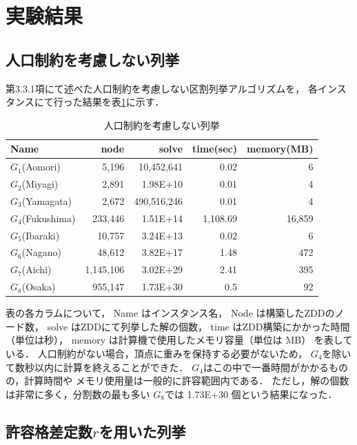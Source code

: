 \section{実験結果}

\subsection{人口制約を考慮しない列挙}

第3.3.1項にて述べた人口制約を考慮しない区割列挙アルゴリズムを，
各インスタンスにて行った結果を表\ref{out_normal}に示す．

\begin{table}[htbp]
  \caption{人口制約を考慮しない列挙}
  \label{out_normal}
  \centering
  \begin{tabular}{l||r|r|r|r}
    \hline
    Name & node & solve & time(sec) & memory(MB) \\
    \hline \hline
    $G_1$(Aomori) & 5{,}196 & 10{,}452{,}641 & 0.02 & 6 \\
    $G_2$(Miyagi) & 2{,}891 & 1.98E+10 & 0.01 & 4 \\
    $G_3$(Yamagata) & 2{,}672 & 490{,}516{,}246 & 0.01 & 4 \\
    $G_4$(Fukushima) & 233{,}446 & 1.51E+14 & 1{,}108.69 & 16{,}859 \\
    $G_5$(Ibaraki) & 10{,}757 & 3.24E+13 & 0.02 & 6 \\
    $G_6$(Nagano) & 48{,}612 & 3.82E+17 & 1.48 & 472 \\
    $G_7$(Aichi) & 1{,}145{,}106 & 3.02E+29 & 2.41 & 395 \\
    $G_8$(Osaka) & 955{,}147 & 1.73E+30 & 0.5 & 92 \\
    \hline
  \end{tabular}
\end{table}

表の各カラムについて，
Name はインスタンス名，
Node は構築したZDDのノード数，
solve はZDDにて列挙した解の個数，
time はZDD構築にかかった時間（単位は秒），
memory は計算機で使用したメモリ容量（単位は MB）
を表している．
人口制約がない場合，頂点に重みを保持する必要がないため，
$G_4$を除いて数秒以内に計算を終えることができた．
$G_4$はこの中で一番時間がかかるものの，計算時間や
メモリ使用量は一般的に許容範囲内である．
ただし，解の個数は非常に多く，分割数の最も多い
$G_8$では 1.73E+30 個という結果になった．

\subsection{許容格差定数$r$を用いた列挙}

